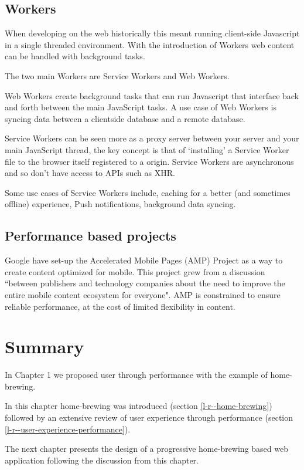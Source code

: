 \subsection{Workers} \label{l-r--workers}

When developing on the web historically this meant running client-side Javascript in a single threaded environment. With the introduction of Workers web content can be handled with background tasks.

The two main Workers are Service Workers and Web Workers.

Web Workers create background tasks that can run Javascript that interface back and forth between the main JavaScript tasks. A use case of Web Workers is syncing data between a clientside database and a remote database. \cite{using_web_workers}

Service Workers can be seen more as a proxy server between your server and your main JavaScript thread, the key concept is that of `installing' a Service Worker file to the browser itself registered to a origin. Service Workers are asynchronous and so don't have access to APIs such as XHR.

Some use cases of Service Workers include, caching for a better (and sometimes offline) experience, Push notifications, background data syncing. \cite{service_worker}

\subsection{Performance based projects}

Google have set-up the Accelerated Mobile Pages (AMP) Project as a way to create content optimized for mobile. This project grew from a discussion ``between publishers and technology companies about the need to improve the entire mobile content ecosystem for everyone". AMP is constrained to ensure reliable performance, at the cost of limited flexibility in content. \cite{intro_to_amp}

\section{Summary} \label{l-r--summary}

In Chapter 1 we proposed user through performance with the example of home-brewing.

In this chapter home-brewing was introduced (section \ref{l-r--home-brewing}) followed by an extensive review of user experience through performance (section \ref{l-r--user-experience-performance}).

The next chapter presents the design of a progressive home-brewing based web application following the discussion from this chapter.
